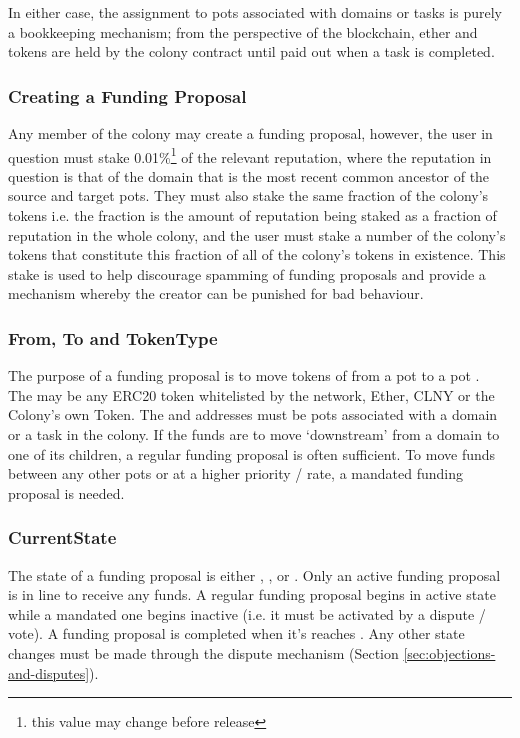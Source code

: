 In either case, the assignment to pots associated with domains or tasks is purely a bookkeeping mechanism; from the perspective of the blockchain, ether and tokens are held by the colony contract until paid out when a task is completed. 

\subsubsection*{Creating a Funding Proposal}
Any member of the colony may create a funding proposal, however, the user in question must stake 0.01\%\footnote{this value may change before release} of the relevant reputation, where the reputation in question is that of the domain that is the most recent common ancestor of the source and target pots. They must also stake the same fraction of the colony's tokens i.e. the fraction is the amount of reputation being staked as a fraction of reputation in the whole colony, and the user must stake a number of the colony's tokens that constitute this fraction of all of the colony's tokens in existence. This stake is used to help discourage spamming of funding proposals and provide a mechanism whereby the creator can be punished for bad behaviour. 

\subsubsection*{From, To and TokenType}
The purpose of a funding proposal is to move tokens of  from a pot  to a pot . \\
The  may be any ERC20 token whitelisted by the network, Ether, CLNY or the Colony's own Token. The  and  addresses must be pots associated with a domain or a task in the colony. If the funds are to move `downstream' from a domain to one of its children, a regular funding proposal is often sufficient. To move funds between any other pots or at a higher priority / rate, a mandated funding proposal is needed.

\subsubsection*{CurrentState}
The state of a funding proposal is either , ,  or . Only an active funding proposal is in line to receive any funds. A regular funding proposal begins in active state while a mandated one begins inactive (i.e. it must be activated by a dispute / vote). A funding proposal is completed when it's  reaches . Any other state changes must be made through the dispute mechanism (Section \ref{sec:objections-and-disputes}).

